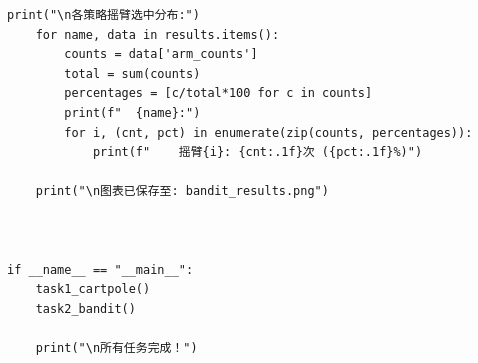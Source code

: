 \documentclass[12pt,a4paper]{article}
\begin{document}
\begin{lstlisting}[caption={强化学习实验完整代码}]
    print("\n各策略摇臂选中分布:")
    for name, data in results.items():
        counts = data['arm_counts']
        total = sum(counts)
        percentages = [c/total*100 for c in counts]
        print(f"  {name}:")
        for i, (cnt, pct) in enumerate(zip(counts, percentages)):
            print(f"    摇臂{i}: {cnt:.1f}次 ({pct:.1f}%)")
    
    print("\n图表已保存至: bandit_results.png")



if __name__ == "__main__":   
    task1_cartpole()
    task2_bandit()
    
    print("\n所有任务完成！")
\end{lstlisting}
\end{document}
